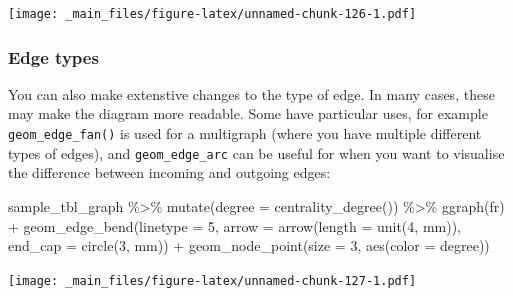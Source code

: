 \documentclass[
]{book}
\newenvironment{Shaded}{\begin{snugshade}}{\end{snugshade}}
\newcommand{\AttributeTok}[1]{\textcolor[rgb]{0.77,0.63,0.00}{#1}}
\newcommand{\DecValTok}[1]{\textcolor[rgb]{0.00,0.00,0.81}{#1}}
\newcommand{\FunctionTok}[1]{\textcolor[rgb]{0.00,0.00,0.00}{#1}}
\newcommand{\NormalTok}[1]{#1}
\newcommand{\SpecialCharTok}[1]{\textcolor[rgb]{0.00,0.00,0.00}{#1}}
\newcommand{\StringTok}[1]{\textcolor[rgb]{0.31,0.60,0.02}{#1}}
\begin{document}
\texttt{[image: \_main\_files/figure-latex/unnamed-chunk-126-1.pdf]}

\hypertarget{edge-types}{%
\subsubsection{Edge types}\label{edge-types}}

You can also make extenstive changes to the type of edge. In many cases, these may make the diagram more readable. Some have particular uses, for example \texttt{geom\_edge\_fan()} is used for a multigraph (where you have multiple different types of edges), and \texttt{geom\_edge\_arc} can be useful for when you want to visualise the difference between incoming and outgoing edges:

\begin{Shaded}
\begin{Highlighting}[]
\NormalTok{sample\_tbl\_graph }\SpecialCharTok{\%\textgreater{}\%} 
  \FunctionTok{mutate}\NormalTok{(}\AttributeTok{degree =} \FunctionTok{centrality\_degree}\NormalTok{()) }\SpecialCharTok{\%\textgreater{}\%} 
  \FunctionTok{ggraph}\NormalTok{(}\StringTok{\textquotesingle{}fr\textquotesingle{}}\NormalTok{) }\SpecialCharTok{+} 
  \FunctionTok{geom\_edge\_bend}\NormalTok{(}\AttributeTok{linetype =} \DecValTok{5}\NormalTok{,}
                 \AttributeTok{arrow =} \FunctionTok{arrow}\NormalTok{(}\AttributeTok{length =} \FunctionTok{unit}\NormalTok{(}\DecValTok{4}\NormalTok{, }\StringTok{\textquotesingle{}mm\textquotesingle{}}\NormalTok{)), }
                   \AttributeTok{end\_cap =} \FunctionTok{circle}\NormalTok{(}\DecValTok{3}\NormalTok{, }\StringTok{\textquotesingle{}mm\textquotesingle{}}\NormalTok{)) }\SpecialCharTok{+} 
  \FunctionTok{geom\_node\_point}\NormalTok{(}\AttributeTok{size =} \DecValTok{3}\NormalTok{, }\FunctionTok{aes}\NormalTok{(}\AttributeTok{color =}\NormalTok{ degree))}
\end{Highlighting}
\end{Shaded}

\texttt{[image: \_main\_files/figure-latex/unnamed-chunk-127-1.pdf]}
\end{document}
